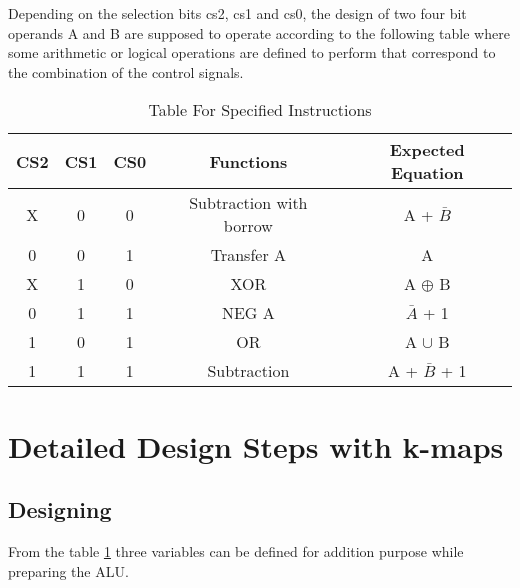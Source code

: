 \documentclass[12pt]{article}
\begin{document}
Depending on the selection bits cs2, cs1 and cs0, the design of two four bit operands A and B are supposed to operate according to the following table where some arithmetic or logical operations are defined to perform that correspond to the combination of the control signals.

\large{
\begin{table}[H]

    \centering
    \begin{adjustbox}{width = \textwidth}
    
    \begin{tabular}{|c c c|c|c|}
    \hline
    CS2 & CS1 & CS0 & Functions & Expected Equation\\

    \hline

    X & 0 & 0 & Subtraction with borrow & A + $\bar{B}$\\

    0 & 0 & 1 & Transfer A & A\\

    X & 1 & 0 & XOR & A $\oplus$ B\\

    0 & 1 & 1 & NEG A & $\bar{A}$ + 1\\

    1 & 0 & 1 & OR & A $\cup$ B\\

    1 & 1 & 1 & Subtraction & A + $\bar{B}$ + 1\\

    \hline
    
    \end{tabular}
    
    
    \end{adjustbox}
    \caption{Table For Specified Instructions}
    \label{tab:Instructiontable}
\end{table} 
}

\section{Detailed Design Steps with k-maps}

\subsection{Designing}
From the table \ref{tab:Instructiontable} three variables can be defined for addition purpose while preparing the ALU.\\
\end{document}
